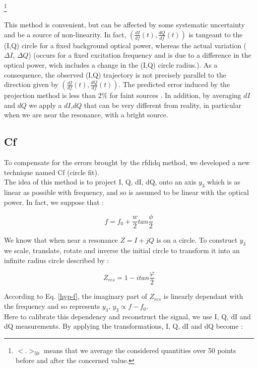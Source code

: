 \footnote{$<.>_{50}$ means that we average the considered quantities over 50 points before and after the concerned value.}

This method is convenient, but can be affected by some systematic uncertainty and be a source of non-linearity. In fact, $(\frac{dI}{df}(t),\frac{dQ}{df}(t))$ is tangeant to the (I,Q) circle for a fixed background optical power, whereas the actual variation ($\Delta I$, $\Delta Q$) (occurs for a fixed excitation frequency and is due to a difference in the optical power, wich includes a change in the (I,Q) circle radius.). As a consequence, the observed (I,Q) trajectory is not precisely parallel to the direction given by $(\frac{dI}{df}(t),\frac{dQ}{df}(t))$. The predicted error induced by the projection method is less than 2\% for faint sources \citep{2013A&A...551L..12C}. In addition, by averaging $dI$ and $dQ$ we apply a $dI$,$dQ$ that can be very different from reality, in particular when we are near the resonance, with a bright source.\\

\subsection{Cf}
To compensate for the errors brought by the rfdidq method, we developed a new technique named Cf (circle fit).\\
The idea of this method is to project I, Q, dI, dQ, onto an axis $y_{3}$ which is as linear as possible with frequency, and so is assumed to be linear with the optical power. In fact, we suppose that :

\begin{equation}
\label{hyp-f}
f = f_{0} + \frac{w}{2} tan\frac{\phi}{2}
\end{equation}

We know that when near a resonance $Z = I+jQ$ is on a circle. To construct $y_{3}$ we scale, translate, rotate and inverse the initial circle to transform it into an infinite radius circle described by :

\begin{equation}
\label{Zres}
Z_{res} = 1 - i tan\frac{\varphi}{2}
\end{equation}

According to Eq. \ref{hyp-f}, the imaginary part of $Z_{res}$ is linearly dependant with the frequency and so represents $y_{3}$, $y_{3} \propto f - f_{0}$.\\
Here to calibrate this dependency and reconstruct the signal, we use I, Q, dI and dQ measurements. By applying the transformations, I, Q, dI and dQ become : 


